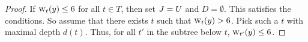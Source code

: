 \begin{proof}



    If $\fwe(y) \le 6$ for all $t \in T$, then set $\tlayer = U$ and $D =
    \emptyset$. This satisfies the conditions. So assume that
    there exists $t$ such that $\fwe(y) > 6$. Pick such a $t$ with maximal
    depth $d(t)$. Thus, for all $t'$ in the subtree below $t$, $\fwe[t'](y)
    \le 6$.


\end{proof}

